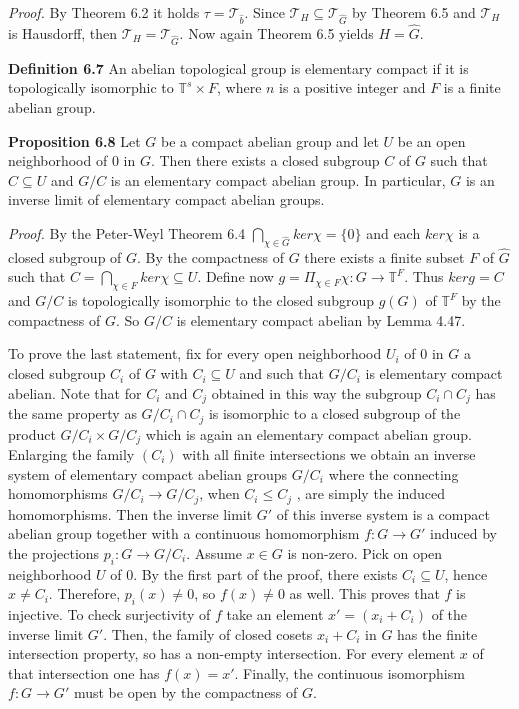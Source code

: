 \documentclass[12pt]{article}
\begin{document}
\begin{itemize}
\begin{itemize}
\emph{Proof.} By Theorem 6.2 it holds $\tau = \mathcal{T}_{\hat{b}}$. Since $\mathcal{T}_H \subseteq \mathcal{T}_{\hat{G}}$ by Theorem 6.5 and $\mathcal{T}_H$ is Hausdorff, then $\mathcal{T}_H = \mathcal{T}_{\hat{G}}$.
Now again Theorem 6.5 yields $H = \hat{G}$.


\textbf{Definition 6.7} An abelian topological group is elementary compact if it is topologically isomorphic to $\mathbb{T}^s \times F$,
where $n$ is a positive integer and $F$ is a finite abelian group.


\textbf{Proposition 6.8} Let $G$ be a compact abelian group and let $U$ be an open neighborhood of 0 in $G$. Then
there exists a closed subgroup $C$ of $G$ such that $C \subseteq U$ and $G/C$ is an elementary compact abelian group. In
particular, $G$ is an inverse limit of elementary compact abelian groups.


    \emph{Proof.} By the Peter-Weyl Theorem 6.4 $\bigcap_{\chi \in \hat{G}} ker \chi = \{0\}$ and each $ker \chi$ is a closed subgroup of $G$. By the
compactness of $G$ there exists a finite subset $F$ of $\hat{G}$ such that $C =\bigcap_{\chi \in F} ker \chi \subseteq U$. Define now $g =\Pi_{\chi \in F} \chi :G \to \mathbb{T}^F$. 
Thus $ker g = C$ and $G/C$ is topologically isomorphic to the closed subgroup $g(G)$ of $\mathbb{T}^F$ by the
compactness of $G$. So $G/C$ is elementary compact abelian by Lemma 4.47.


    To prove the last statement, fix for every open neighborhood $U_i$ of 0 in $G$ a closed subgroup $C_i$ of $G$ with
$C_i \subseteq U$ and such that $G/C_i$ is elementary compact abelian. Note that for $C_i$ and $C_j$ obtained in this way
the subgroup $C_i \cap C_j$ has the same property as $G/C_i \cap C_j$ is isomorphic to a closed subgroup of the product
$G/C_i \times G/C_j$ which is again an elementary compact abelian group. Enlarging the family $(C_i)$ with all finite
intersections we obtain an inverse system of elementary compact abelian groups $G/C_i$ where the connecting
homomorphisms $G/C_i \to G/C_j$, when $C_i\leq C_j$ , are simply the induced homomorphisms. Then the inverse limit
$G'$ of this inverse system is a compact abelian group together with a continuous homomorphism $f : G \to G'$
induced by the projections $p_i: G \to G/C_i$. Assume $x \in G$ is non-zero. Pick on open neighborhood $U$ of 0. By
the first part of the proof, there exists $C_i \subseteq U$, hence $x \neq C_i$. Therefore, $p_i(x) \neq 0$, so $f(x) \neq 0$ as well. This
proves that $f$ is injective. To check surjectivity of $f$ take an element $x' = (x_i +C_i)$ of the inverse limit $G'$. Then,
the family of closed cosets $x_i + C_i$ in $G$ has the finite intersection property, so has a non-empty intersection.
For every element $x$ of that intersection one has $f(x) = x'$. Finally, the continuous isomorphism $f : G \to G'$
must be open by the compactness of $G$.



\end{itemize}
\end{itemize}
\end{document}
